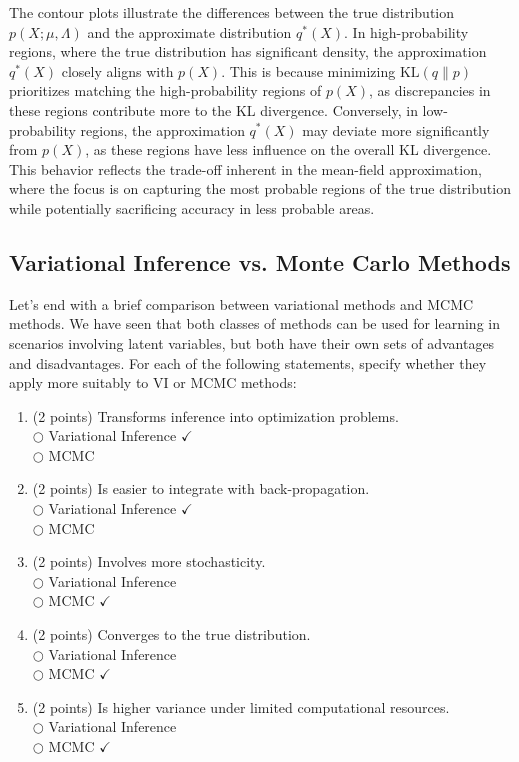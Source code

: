 \documentclass[a3paper,12pt]{extarticle} %
\begin{document}
\begin{enumerate}
    The contour plots illustrate the differences between the true distribution \( p(X; \mu, \Lambda) \) and the approximate distribution \( q^*(X) \). In high-probability regions, where the true distribution has significant density, the approximation \( q^*(X) \) closely aligns with \( p(X) \). This is because minimizing \( \text{KL}(q \| p) \) prioritizes matching the high-probability regions of \( p(X) \), as discrepancies in these regions contribute more to the KL divergence. Conversely, in low-probability regions, the approximation \( q^*(X) \) may deviate more significantly from \( p(X) \), as these regions have less influence on the overall KL divergence. This behavior reflects the trade-off inherent in the mean-field approximation, where the focus is on capturing the most probable regions of the true distribution while potentially sacrificing accuracy in less probable areas.
\end{enumerate}

\subsection{Variational Inference vs. Monte Carlo Methods}

Let’s end with a brief comparison between variational methods and MCMC methods. We have seen that both
classes of methods can be used for learning in scenarios involving latent variables, but both have their own sets of
advantages and disadvantages. For each of the following statements, specify whether they apply more suitably to
VI or MCMC methods:

\begin{enumerate}
    \item (2 points) Transforms inference into optimization problems.\\
    \(\bigcirc\) Variational Inference \(\checkmark\) \\
    \(\bigcirc\) MCMC
    \item (2 points) Is easier to integrate with back-propagation.\\
    \(\bigcirc\) Variational Inference \(\checkmark\) \\
    \(\bigcirc\) MCMC
    \item (2 points) Involves more stochasticity.\\
    \(\bigcirc\) Variational Inference \\
    \(\bigcirc\) MCMC \(\checkmark\)
    \item (2 points) Converges to the true distribution.\\
    \(\bigcirc\) Variational Inference \\
    \(\bigcirc\) MCMC \(\checkmark\)
    \item (2 points) Is higher variance under limited computational resources.\\
    \(\bigcirc\) Variational Inference  \\
    \(\bigcirc\) MCMC \(\checkmark\)
\end{enumerate}
\end{document}
